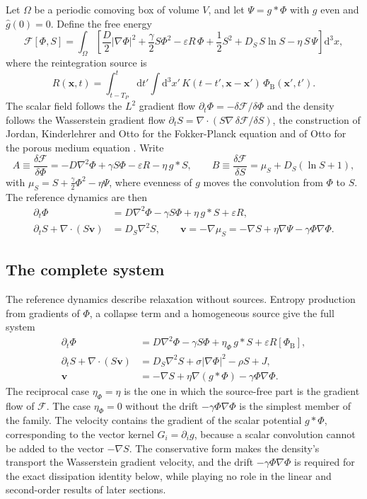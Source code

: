 \documentclass[11pt]{article}
\theoremstyle{definition}
\theoremstyle{remark}
\newcommand{\dd}{\mathrm{d}}
\newcommand{\vv}{\mathbf{v}}
\newcommand{\xx}{\mathbf{x}}
\newcommand{\Phib}{{\Phi_{\mathrm{B}}}}
\newcommand{\FF}{\mathcal{F}}
\begin{document}
Let $\Omega$ be a periodic comoving box of volume $V$, and let $\Psi=g*\Phi$ with $g$ even and $\hat g(0)=0$. Define the free energy
\begin{equation}
\FF[\Phi,S]=\int_\Omega\left[\frac D2|\nabla\Phi|^2+\frac\gamma2S\Phi^2-\varepsilon R\,\Phi+\frac12S^2+D_S\,S\ln S-\eta\,S\,\Psi\right]\dd^3x,
\label{eq:F}
\end{equation}
where the reintegration source is
\begin{equation}
R(\xx,t)=\int_{t-T_P}^{t}\dd t'\int\dd^3x'\,K(t-t',\xx-\xx')\,\Phib(\xx',t').
\label{eq:R}
\end{equation}
The scalar field follows the $L^2$ gradient flow $\partial_t\Phi=-\delta\FF/\delta\Phi$ and the density follows the Wasserstein gradient flow $\partial_tS=\nabla\!\cdot\!(S\nabla\,\delta\FF/\delta S)$, the construction of Jordan, Kinderlehrer and Otto for the Fokker-Planck equation and of Otto for the porous medium equation \cite{jko1998,otto2001}. Write
\begin{equation}
A\equiv\frac{\delta\FF}{\delta\Phi}=-D\nabla^2\Phi+\gamma S\Phi-\varepsilon R-\eta\,g*S,\qquad B\equiv\frac{\delta\FF}{\delta S}=\mu_S+D_S(\ln S+1),
\end{equation}
with $\mu_S=S+\tfrac\gamma2\Phi^2-\eta\Psi$, where evenness of $g$ moves the convolution from $\Phi$ to $S$. The reference dynamics are then
\begin{align}
\partial_t\Phi&=D\nabla^2\Phi-\gamma S\Phi+\eta\,g*S+\varepsilon R,\label{eq:Phi}\\
\partial_tS+\nabla\!\cdot\!(S\vv)&=D_S\nabla^2S,\qquad\vv=-\nabla\mu_S=-\nabla S+\eta\nabla\Psi-\gamma\Phi\nabla\Phi.\label{eq:S0}
\end{align}

\subsection{The complete system}

The reference dynamics describe relaxation without sources. Entropy production from gradients of $\Phi$, a collapse term and a homogeneous source give the full system
\begin{align}
\partial_t\Phi&=D\nabla^2\Phi-\gamma S\Phi+\eta_\Phi\,g*S+\varepsilon R[\Phib],\label{eq:full1}\\
\partial_tS+\nabla\!\cdot\!(S\vv)&=D_S\nabla^2S+\sigma|\nabla\Phi|^2-\rho S+J,\label{eq:full2}\\
\vv&=-\nabla S+\eta\nabla(g*\Phi)-\gamma\Phi\nabla\Phi.\label{eq:full3}
\end{align}
The reciprocal case $\eta_\Phi=\eta$ is the one in which the source-free part is the gradient flow of $\FF$. The case $\eta_\Phi=0$ without the drift $-\gamma\Phi\nabla\Phi$ is the simplest member of the family. The velocity contains the gradient of the scalar potential $g*\Phi$, corresponding to the vector kernel $G_i=\partial_ig$, because a scalar convolution cannot be added to the vector $-\nabla S$. The conservative form makes the density's transport the Wasserstein gradient velocity, and the drift $-\gamma\Phi\nabla\Phi$ is required for the exact dissipation identity below, while playing no role in the linear and second-order results of later sections.
\end{document}

